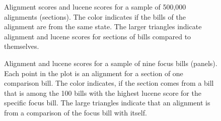 \documentclass[12pt]{article} %
\begin{document}
\begin{figure}[ht!]
    \caption{Alignment scores and lucene scores for a sample of 500,000 alignments (sections). The color indicates if the bills of the alignment are from the same state. The larger triangles indicate alignment and lucene scores for sections of bills compared to themselves.}
\label{fig:lu_al_scores} 
\end{figure}

\begin{figure}[ht!]
    \caption{Alignment and lucene scores for a sample of nine focus bills (panels). Each point in the plot is an alignment for a section of one comparison bill. The color indicates, if the section comes from a bill that is among the 100 bills with the highest lucene score for the specific focus bill. The large triangles indicate that an alignment is from a comparison of the focus bill with itself.}
\label{fig:closest100} 
\end{figure}
\end{document}
